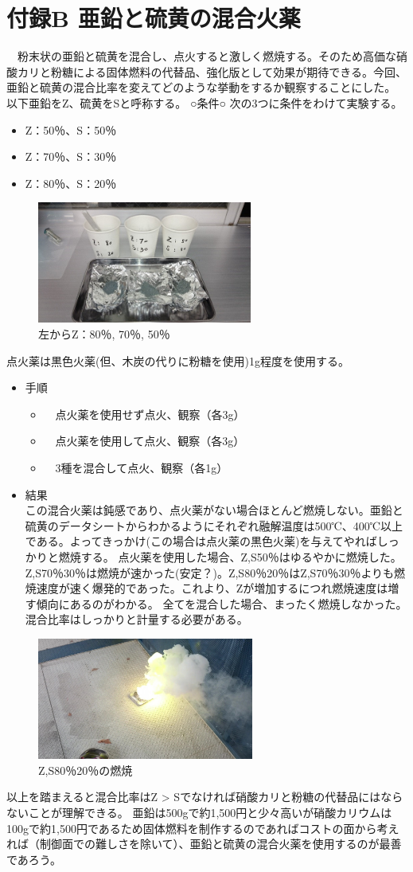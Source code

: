 \section{付録B 亜鉛と硫黄の混合火薬}
　粉末状の亜鉛と硫黄を混合し、点火すると激しく燃焼する。そのため高価な硝酸カリと粉糖による固体燃料の代替品、強化版として効果が期待できる。今回、亜鉛と硫黄の混合比率を変えてどのような挙動をするか観察することにした。
以下亜鉛をZ、硫黄をSと呼称する。
○条件○
次の3つに条件をわけて実験する。
\begin{itemize}
\item Z：50％、S：50％
\item Z：70％、S：30％
\item Z：80％、S：20％
\end{itemize}
\begin{figure}[H]
  \centering
  \includegraphics[height=4cm,clip]{okada/image/B.jpg}
  \caption{左からZ：80％, 70％, 50％}
  \label{fig:B}
\end{figure}
点火薬は黒色火薬(但、木炭の代りに粉糖を使用)1g程度を使用する。
\begin{itemize}
\item 手順
  \begin{itemize}
    \item　点火薬を使用せず点火、観察（各3g）
    \item　点火薬を使用して点火、観察（各3g）
    \item　3種を混合して点火、観察（各1g）
  \end{itemize}
\item 結果\\
この混合火薬は鈍感であり、点火薬がない場合ほとんど燃焼しない。亜鉛と硫黄のデータシートからわかるようにそれぞれ融解温度は500℃、400℃以上である。よってきっかけ(この場合は点火薬の黒色火薬)を与えてやればしっかりと燃焼する。
点火薬を使用した場合、Z,S50％はゆるやかに燃焼した。Z,S70％30％は燃焼が速かった(安定？)。Z,S80％20％はZ,S70％30％よりも燃焼速度が速く爆発的であった。これより、Zが増加するにつれ燃焼速度は増す傾向にあるのがわかる。
全てを混合した場合、まったく燃焼しなかった。混合比率はしっかりと計量する必要がある。
\end{itemize}
\begin{figure}[H]
  \centering
  \includegraphics[height=4cm,clip]{okada/image/B_2.jpg}
  \caption{Z,S80％20％の燃焼}
  \label{fig:B}
\end{figure}

以上を踏まえると混合比率はZ > Sでなければ硝酸カリと粉糖の代替品にはならないことが理解できる。
亜鉛は500gで約1,500円と少々高いが硝酸カリウムは100gで約1,500円であるため固体燃料を制作するのであればコストの面から考えれば（制御面での難しさを除いて）、亜鉛と硫黄の混合火薬を使用するのが最善であろう。
